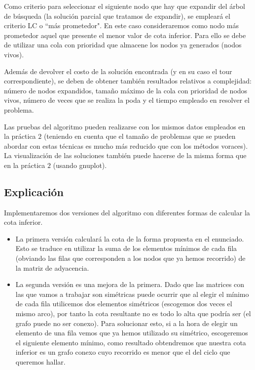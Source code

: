 Como criterio para seleccionar el siguiente nodo que hay que expandir del árbol de búsqueda
(la solución parcial que tratamos de expandir), se empleará el criterio LC o ``más prometedor".
En este caso consideraremos como nodo más prometedor aquel que presente el menor valor de
cota inferior. Para ello se debe de utilizar una cola con prioridad que almacene los nodos ya
generados (nodos vivos).

Además de devolver el costo de la solución encontrada (y en su caso el tour correspondiente),
se deben de obtener también resultados relativos a complejidad: número de nodos expandidos,
tamaño máximo de la cola con prioridad de nodos vivos, número de veces que se realiza la poda
y el tiempo empleado en resolver el problema.

Las pruebas del algoritmo pueden realizarse con los mismos datos empleados en la práctica
$2$ (teniendo en cuenta que el tamaño de problemas que se pueden abordar con estas técnicas es
mucho más reducido que con los métodos voraces). La visualización de las soluciones también
puede hacerse de la misma forma que en la práctica $2$ (usando gnuplot).

\subsection{Explicación}

Implementaremos dos versiones del algoritmo con diferentes formas de calcular la cota inferior.

\begin{itemize}
\item
La primera versión calculará la cota de la forma propuesta en el enunciado. Esto se traduce en utilizar  la suma de los elementos mínimos de cada fila (obviando las filas que corresponden a los nodos que ya hemos recorrido) de la matriz de adyacencia.

\item
La segunda versión es una mejora de la primera. Dado que las matrices con las que vamos a trabajar son simétricas puede ocurrir que al elegir el mínimo de cada fila utilicemos dos elementos simétricos (escogemos dos veces el mismo arco), por tanto la cota resultante no es todo lo alta que podría ser (el grafo puede no ser conexo). Para solucionar esto, si a la hora de elegir un elemento de una fila vemos que ya hemos utilizado su simétrico, escogeremos el siguiente elemento mínimo, como resultado obtendremos que nuestra cota inferior es un grafo conexo cuyo recorrido es menor que el del ciclo que queremos hallar.
\end{itemize}


